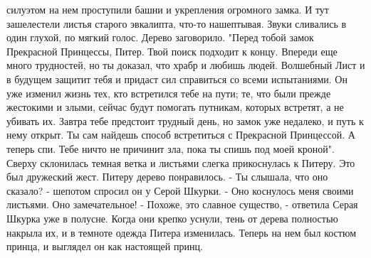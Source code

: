 силуэтом на нем проступили башни и укрепления огромного замка.
    И тут зашелестели листья старого эвкалипта, что-то нашептывая. 
Звуки сливались в один глухой, по мягкий голос. Дерево заговорило.
    "Перед тобой замок Прекрасной Принцессы, Питер. Твой поиск 
подходит к концу. Впереди еще много трудностей, но ты доказал, что 
храбр и любишь людей. Волшебный Лист и в будущем защитит тебя и 
придаст сил справиться со всеми испытаниями. Он уже изменил жизнь тех, 
кто встретился тебе на пути; те, что были прежде жестокими и злыми, 
сейчас будут помогать путникам, которых встретят, а не убивать их.
    Завтра тебе предстоит трудный день, но замок уже недалеко, и путь 
к нему открыт. Ты сам найдешь способ встретиться с Прекрасной 
Принцессой. А теперь спи. Тебе ничто не причинит зла, пока ты спишь 
под моей кроной".
    Сверху склонилась темная ветка и листьями слегка прикоснулась к 
Питеру. Это был дружеский жест.
    Питеру дерево понравилось.
    - Ты слышала, что оно сказало? - шепотом спросил он у Серой 
Шкурки. - Оно коснулось меня своими листьями. Оно замечательное!
    - Похоже, это славное существо, - ответила Серая Шкурка уже в 
полусне.
    Когда они крепко уснули, тень от дерева полностью накрыла их, и в 
темноте одежда Питера изменилась. Теперь на нем был костюм принца, и 
выглядел он как настоящей принц.
